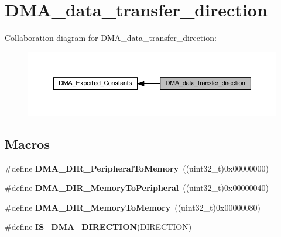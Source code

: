 \hypertarget{group___d_m_a__data__transfer__direction}{}\section{D\+M\+A\+\_\+data\+\_\+transfer\+\_\+direction}
\label{group___d_m_a__data__transfer__direction}
Collaboration diagram for D\+M\+A\+\_\+data\+\_\+transfer\+\_\+direction\+:
\nopagebreak
\begin{figure}[H]
\begin{center}
\leavevmode
\includegraphics[width=350pt]{group___d_m_a__data__transfer__direction}
\end{center}
\end{figure}
\subsection*{Macros}
\begin{DoxyCompactItemize}
\item 
\mbox{\label{group___d_m_a__data__transfer__direction_ga4d7847b57371eef92ec5da34511416a7}} 
\#define {\bfseries D\+M\+A\+\_\+\+D\+I\+R\+\_\+\+Peripheral\+To\+Memory}~((uint32\+\_\+t)0x00000000)
\item 
\mbox{\label{group___d_m_a__data__transfer__direction_gae1e6aa2722beb09b5be7140205244986}} 
\#define {\bfseries D\+M\+A\+\_\+\+D\+I\+R\+\_\+\+Memory\+To\+Peripheral}~((uint32\+\_\+t)0x00000040)
\item 
\mbox{\label{group___d_m_a__data__transfer__direction_gafb7d5b786f2fb56a903936cdc6d5e89a}} 
\#define {\bfseries D\+M\+A\+\_\+\+D\+I\+R\+\_\+\+Memory\+To\+Memory}~((uint32\+\_\+t)0x00000080)
\item 
\#define {\bfseries I\+S\+\_\+\+D\+M\+A\+\_\+\+D\+I\+R\+E\+C\+T\+I\+ON}(D\+I\+R\+E\+C\+T\+I\+ON)
\end{DoxyCompactItemize}


